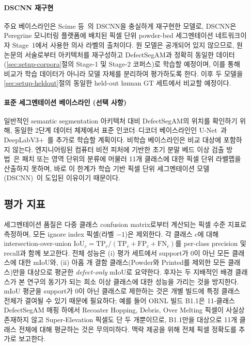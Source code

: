 \paragraph{DSCNN 재구현}
주요 베이스라인은 Scime 등~\cite{Scime2020DSCNN}의 DSCNN을 충실하게
재구현한 모델로, DSCNN은 Peregrine 모니터링 플랫폼에 배치된 픽셀 단위
powder-bed 세그멘테이션 네트워크이자 Stage~1에서 사용한 의사 라벨의
출처이다. 원 모델은 공개되어 있지 않으므로, 원 논문의 서술로부터
아키텍처를 재구성하고 DefectSegAM과 정확히 동일한 데이터
(\ref{sec:setup-corpora}절의 Stage-1 및 Stage-2 코퍼스)로 학습할
예정이며, 이를 통해 비교가 학습 데이터가 아니라 모델 자체를 분리하여
평가하도록 한다. 이후 두 모델을 \ref{sec:setup-heldout}절의 동일한
held-out human GT 세트에서 비교할 예정이다.

\paragraph{표준 세그멘테이션 베이스라인 (선택 사항)}
일반적인 semantic segmentation 아키텍처 대비 DefectSegAM의 위치를
확인하기 위해, 동일한 2단계 데이터 체제에서 표준 인코더--디코더
베이스라인인 U-Net~\cite{Ronneberger2015UNet}과
DeepLabV3+~\cite{Chen2018DeepLabV3Plus}를 추가로 학습할 계획이다.
비학습 베이스라인은 비교 대상에 포함하지 않는다. 엔지니어링된 컴퓨터
비전 피처에 기반한 초기 분말 베드 이상 검출
방법~\cite{Scime2018Anomaly,Gobert2018InProcess}은 패치 또는 영역
단위의 분류에 머물러 11개 클래스에 대한 픽셀 단위 라벨맵을 산출하지
못하며, 바로 이 한계가 학습 기반 픽셀 단위 세그멘테이션
모델(DSCNN)~\cite{Scime2020DSCNN}이 도입된 이유이기 때문이다.

\subsection{평가 지표}\label{sec:setup-metrics}

세그멘테이션 품질은 다중 클래스 confusion matrix로부터 계산되는 픽셀
수준 지표로 측정하며, 모든 ignore index 픽셀(라벨 \(-1\))은 제외한다.
각 클래스 \(c\)에 대해 intersection-over-union
\(\mathrm{IoU}_c = \mathrm{TP}_c/(\mathrm{TP}_c + \mathrm{FP}_c +
\mathrm{FN}_c)\)를 per-class precision 및 recall과 함께 보고한다. 전체
성능은 (i) 평가 세트에서 support가 0이 아닌 모든 클래스에 대한 mIoU와,
(ii) 아홉 개 결함 클래스(Powder와 Printed를 제외한 모든 클래스)만을
대상으로 평균한 \emph{defect-only} mIoU로 요약한다. 후자는 두 지배적인
배경 클래스가 본 연구의 동기가 되는 희소 이상 클래스에 대한 성능을
가리는 것을 방지한다. mIoU 평균을 support가 0이 아닌 클래스로 제한하는
것은 개별 빌드에 특정 클래스 전체가 결여될 수 있기 때문에 필요하다;
예를 들어 ORNL 빌드 B1.1은 11-클래스 DefectSegAM 매핑 하에서 Recoater
Hopping, Debris, Over Melting 픽셀이 사실상 존재하지 않고
Super-Elevation 픽셀도 단 두 개뿐이므로, B1.1만을 대상으로 11개 클래스
전체에 대해 평균하는 것은 무의미하다. 맥락 제공을 위해 전체 픽셀
정확도를 추가로 보고한다.


